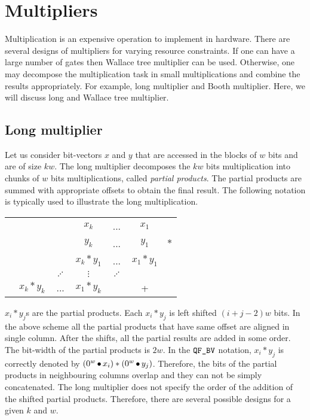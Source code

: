 \section{Multipliers}

Multiplication is an expensive operation to implement in hardware.
%
There are several designs of multipliers for varying
resource constraints.
%
If one can have a large number of gates then Wallace tree
multiplier can be used.
%
Otherwise, one may decompose the multiplication task in
small multiplications and combine the results appropriately.
%
For example, long multiplier and Booth multiplier.
%
Here, we will discuss long and Wallace tree multiplier.

\subsection{Long multiplier}\label{sec:long-mult}

Let us consider bit-vectors $x$ and $y$ that are accessed in the blocks of $w$
bits and are of size $kw$.
%
The long multiplier decomposes the $kw$ bits multiplication 
into chunks of $w$ bits multiplications, called {\em partial products}.
%
The partial products are summed with appropriate offsets to obtain
the final result.
%
The following notation is typically used to illustrate
the long multiplication.
%
\begin{center}
\begin{tabular}{c@{\quad}c@{\quad}c@{\quad}c@{\quad}c@{\quad}c@{\quad}c}
  &&& $x_{k}$ & ... & $x_1$&\\ 
  &&& $y_{k}$ & ... & $y_1$&$*$\\ \hline
  &&&$x_k*y_1$& ... & $x_1*y_1$&\\
  &&$\iddots$&$\vdots$& $\iddots$ && \\
  &$x_k*y_k$& ... &$x_1*y_k$&  & +&\\\hline
\end{tabular}  
\end{center}
$x_i * y_j$s are the partial products.
%
Each $x_i*y_j$ is left shifted $(i+j-2)w$ bits. 
%
In the above scheme all the partial products that have same offset are 
aligned in single column.
%
After the shifts, all the partial results are added in some order.
%
The bit-width of the partial products is $2w$.
%
In the $\texttt{QF\_BV}$ notation, $x_i * y_j$ is correctly denoted by
$(0^w \mathop{\bullet} x_i)*(0^w \mathop{\bullet} y_j)$.
%
Therefore, the bits of the partial products in neighbouring columns overlap
and they can not be simply concatenated.
%
The long multiplier does not specify the order of the addition
of the shifted partial products.
%
Therefore, there are several possible designs for a given $k$ and $w$.

